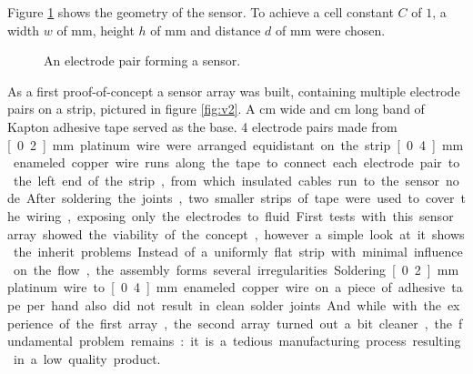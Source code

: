 Figure \ref{fig:sensor} shows the geometry of the sensor. To achieve a cell constant $C$ of $1$, a width $w$ of \unit[1]{mm}, height $h$ of \unit[10]{mm} and distance $d$ of \unit[10]{mm} were chosen.\\

\begin{figure}[H]
	\begin{center}
		\caption{An electrode pair forming a sensor.}
		\label{fig:sensor}
	\end{center}
\end{figure}

As a first proof-of-concept a sensor array was built, containing multiple electrode pairs on a strip, pictured in figure \ref{fig:v2}. A \unit[5]{cm} wide and \unit[25]{cm} long band of Kapton adhesive tape served as the base. 4 electrode pairs made from \unit[0.2]{mm} platinum wire were arranged equidistant on the strip. \unit[0.4]{mm} enameled copper wire runs along the tape to connect each electrode pair to the left end of the strip, from which insulated cables run to the sensor node. After soldering the joints, two smaller strips of tape were used to cover the wiring, exposing only the electrodes to fluid.

First tests with this sensor array showed the viability of the concept, however a simple look at it shows the inherit problems. Instead of a uniformly flat strip with minimal influence on the flow, the assembly forms several irregularities. Soldering \unit[0.2]{mm} platinum wire to \unit[0.4]{mm} enameled copper wire on a piece of adhesive tape per hand also did not result in clean solder joints. And while with the experience of the first array, the second array turned out a bit cleaner, the fundamental problem remains: it is a tedious manufacturing process resulting in a low quality product.

